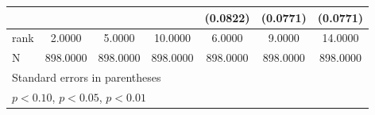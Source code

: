 {\begin{tabular}{l*{6}{c}}
                    &                     &                     &                     &    (0.0822)         &    (0.0771)         &    (0.0771)         \\
\midrule
rank                &      2.0000         &      5.0000         &     10.0000         &      6.0000         &      9.0000         &     14.0000         \\
N                   &    898.0000         &    898.0000         &    898.0000         &    898.0000         &    898.0000         &    898.0000         \\
\bottomrule
\multicolumn{7}{l}{\footnotesize Standard errors in parentheses}\\
\multicolumn{7}{l}{\footnotesize \sym{*} \(p<0.10\), \sym{**} \(p<0.05\), \sym{***} \(p<0.01\)}\\
\end{tabular}
}
